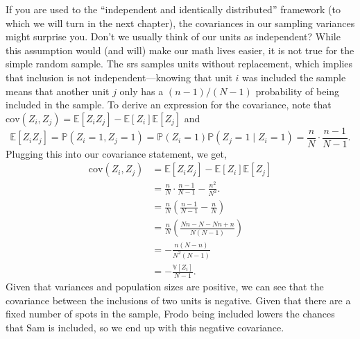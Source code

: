 \documentclass[
  letterpaper,
  DIV=11,
  numbers=noendperiod]{scrreprt}
\newcommand{\E}{\mathbb{E}}
\newcommand{\V}{\mathbb{V}}
\newcommand{\cov}{\text{cov}}
\renewcommand{\P}{\mathbb{P}}
\theoremstyle{definition}
\theoremstyle{definition}
\theoremstyle{plain}
\theoremstyle{remark}
\begin{document}
If you are used to the ``independent and identically distributed''
framework (to which we will turn in the next chapter), the covariances
in our sampling variances might surprise you. Don't we usually think of
our units as independent? While this assumption would (and will) make
our math lives easier, it is not true for the simple random sample. The
srs samples units without replacement, which implies that inclusion is
not independent---knowing that unit \(i\) was included the sample means
that another unit \(j\) only has a \((n-1)/(N-1)\) probability of being
included in the sample. To derive an expression for the covariance, note
that \(\cov(Z_i, Z_j) = \E[Z_iZ_j] - \E[Z_i]\E[Z_j]\) and \[
\E[Z_iZ_j] = \P(Z_i = 1, Z_j = 1) = \P(Z_i = 1)\P(Z_j =1 \mid Z_i = 1) = \frac{n}{N}\cdot \frac{n-1}{N-1}.
\] Plugging this into our covariance statement, we get, \[
\begin{aligned}
\cov(Z_i, Z_j) &= \E[Z_iZ_j] - \E[Z_i]\E[Z_j] \\ &= \frac{n}{N}\cdot \frac{n-1}{N-1} - \frac{n^2}{N^2}. \\
&=\frac{n}{N}\left(\frac{n-1}{N-1} - \frac{n}{N}\right) \\
&= \frac{n}{N}\left(\frac{Nn-N - Nn + n}{N(N-1)}\right) \\
&= -\frac{n(N- n)}{N^2(N-1)} \\
&= -\frac{\V[Z_i]}{N-1}.
\end{aligned}
\] Given that variances and population sizes are positive, we can see
that the covariance between the inclusions of two units is negative.
Given that there are a fixed number of spots in the sample, Frodo being
included lowers the chances that Sam is included, so we end up with this
negative covariance.
\end{document}
